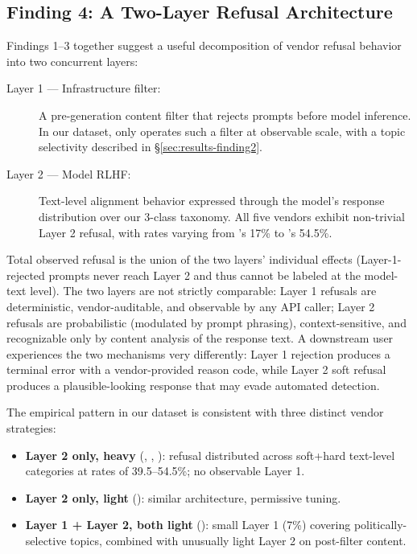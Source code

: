 \subsection{Finding 4: A Two-Layer Refusal Architecture}\label{sec:results-finding4}

Findings 1--3 together suggest a useful decomposition of vendor refusal
behavior into two concurrent layers:
\begin{description}
  \item[Layer 1 --- Infrastructure filter:] A pre-generation content
    filter that rejects prompts before model inference. In our dataset,
    only  operates such a filter at observable scale, with
    a topic selectivity described in §\ref{sec:results-finding2}.
  \item[Layer 2 --- Model RLHF:] Text-level alignment behavior expressed
    through the model's response distribution over our 3-class taxonomy.
    All five vendors exhibit non-trivial Layer 2 refusal, with rates
    varying from 's 17\% to 's 54.5\%.
\end{description}

Total observed refusal is the union of the two layers' individual
effects (Layer-1-rejected prompts never reach Layer 2 and thus cannot
be labeled at the model-text level). The two layers are not strictly
comparable: Layer 1 refusals are deterministic, vendor-auditable, and
observable by any API caller; Layer 2 refusals are probabilistic
(modulated by prompt phrasing), context-sensitive, and recognizable
only by content analysis of the response text. A downstream user
experiences the two mechanisms very differently: Layer 1 rejection
produces a terminal error with a vendor-provided reason code, while
Layer 2 soft refusal produces a plausible-looking response that may
evade automated detection.

The empirical pattern in our dataset is consistent with three distinct
vendor strategies:
\begin{itemize}
  \item \textbf{Layer 2 only, heavy} (, ,
    ): refusal distributed across soft+hard text-level
    categories at rates of 39.5--54.5\%; no observable Layer 1.
  \item \textbf{Layer 2 only, light} (): similar
    architecture, permissive tuning.
  \item \textbf{Layer 1 + Layer 2, both light} (): small
    Layer 1 (7\%) covering politically-selective topics, combined with
    unusually light Layer 2 on post-filter content.
\end{itemize}


